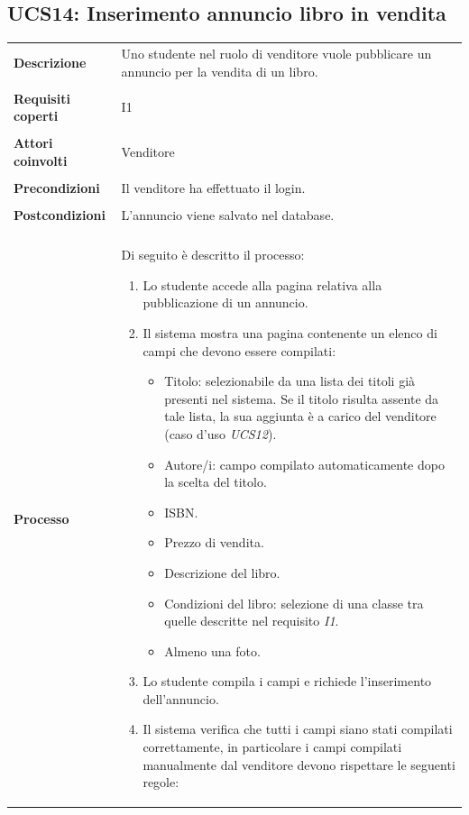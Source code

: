 \documentclass[10pt,a4paper]{report}
\begin{document}
	\subsection{UCS14: Inserimento annuncio libro in vendita}
	\begin{tabular}{lp{}}
		\textbf{Descrizione}&Uno studente nel ruolo di venditore vuole pubblicare un annuncio per la vendita di un libro.\\
		\\
		\textbf{Requisiti coperti}&I1\\
		\\
		\textbf{Attori coinvolti}&Venditore\\
		\\
		\textbf{Precondizioni}&Il venditore ha effettuato il login.\\
		\\
		\textbf{Postcondizioni}&L'annuncio viene salvato nel database.\\
		\\
		\textbf{Processo}&Di seguito è descritto il processo:
		\begin{enumerate}
			\item Lo studente accede alla pagina relativa alla pubblicazione di un annuncio.
			\item Il sistema mostra una pagina contenente un elenco di campi che devono essere compilati:
			\begin{itemize}
				\item Titolo: selezionabile da una lista dei titoli già presenti nel sistema. Se il titolo risulta assente da tale lista, la sua aggiunta è a carico del venditore (caso d'uso \textit{UCS12}).
				\item Autore/i: campo compilato automaticamente dopo la scelta del titolo.
				\item ISBN.
				\item Prezzo di vendita.
				\item Descrizione del libro.
				\item Condizioni del libro: selezione di una classe tra quelle descritte nel requisito \textit{I1}.
				\item Almeno una foto.
			\end{itemize}
			\item Lo studente compila i campi e richiede l'inserimento dell'annuncio.
			\item Il sistema verifica che tutti i campi siano stati compilati correttamente, in particolare i campi compilati manualmente dal venditore devono rispettare le seguenti regole:

\end{enumerate}
\end{tabular}
\end{document}
